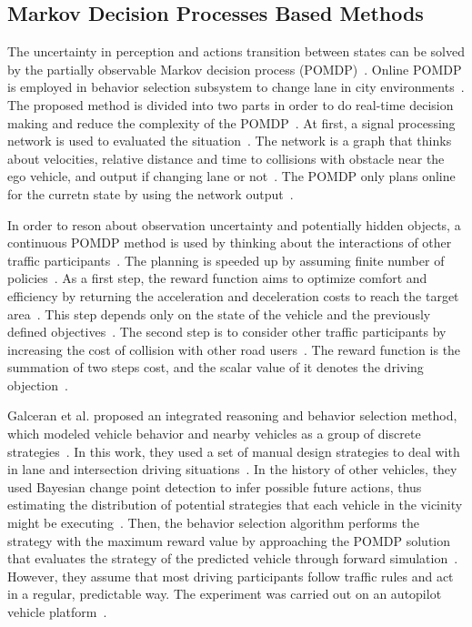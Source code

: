 \documentclass[conference]{IEEEtran}
\begin{document}
\subsection{Markov Decision Processes Based Methods}
The uncertainty in perception and actions transition between states can be solved by the partially observable Markov decision process (POMDP)~\cite{self_driving}. Online POMDP is employed in behavior selection subsystem to change lane in city environments~\cite{Ulbrich2013}. The proposed method is divided into two parts in order to do real-time decision making and reduce the complexity of the POMDP~\cite{Ulbrich2013}. At first, a signal processing network is used to evaluated the situation~\cite{Ulbrich2013}. The network is a graph that thinks about velocities, relative distance and time to collisions with obstacle near the ego vehicle, and output if changing lane or not~\cite{Ulbrich2013}. The POMDP only plans online for the curretn state by using the network output~\cite{Ulbrich2013}.

In order to reson about observation uncertainty and potentially hidden objects, a continuous POMDP method is used by thinking about the interactions of other traffic participants~\cite{Brechtel2014392}. The planning is speeded up by assuming finite number of policies~\cite{Brechtel2014392}. As a first step, the reward function aims to optimize comfort and efficiency by returning the acceleration and deceleration costs to reach the target area~\cite{Brechtel2014392}. This step depends only on the state of the vehicle and the previously defined objectives~\cite{Brechtel2014392}. The second step is to consider other traffic participants by increasing the cost of collision with other road users~\cite{Brechtel2014392}. The reward function is the summation of two steps cost, and the scalar value of it denotes the driving objection~\cite{Brechtel2014392}.

Galceran et al. proposed an integrated reasoning and behavior selection method, which modeled vehicle behavior and nearby vehicles as a group of discrete strategies~\cite{galceran2017multipolicy}. In this work, they used a set of manual design strategies to deal with in lane and intersection driving situations~\cite{galceran2017multipolicy}. In the history of other vehicles, they used Bayesian change point detection to infer possible future actions, thus estimating the distribution of potential strategies that each vehicle in the vicinity might be executing~\cite{galceran2017multipolicy}. Then, the behavior selection algorithm performs the strategy with the maximum reward value by approaching the POMDP solution that evaluates the strategy of the predicted vehicle through forward simulation~\cite{galceran2017multipolicy}. However, they assume that most driving participants follow traffic rules and act in a regular, predictable way. The experiment was carried out on an autopilot vehicle platform~\cite{galceran2017multipolicy}.
\end{document}

